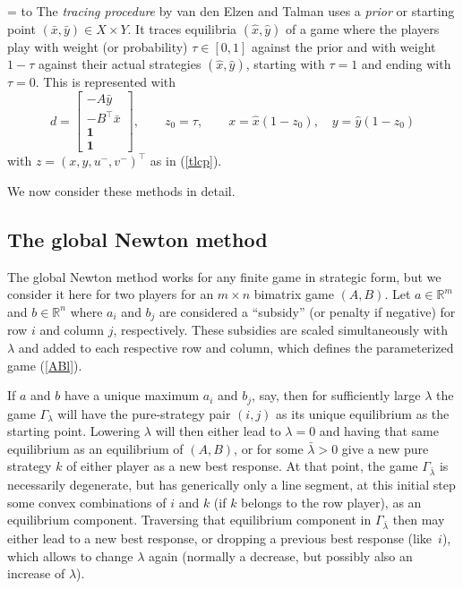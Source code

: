 \documentclass[a4paper,12pt]{article}  %
\def\rmitem#1{\par\hangafter=1\hangindent=\einr
  \noindent\hbox to\einr{\ignorespaces#1\hfill}\ignorespaces}
\newcommand\bullitem{\rmitem{\raise.17ex\hbox{\kern7pt\scriptsize$\bullet$}}}
\theoremstyle{definition}
\def\reals{{\mathbb R}}
\newcommand{\T}{^{\top}}
\newcommand{\0}{{\mathbf0}}
\newcommand{\1}{{\mathbf1}}
\begin{document}
\bullitem
The \textit{tracing procedure} by van den Elzen and Talman
uses a \textit{prior} or starting point $(\bar x,\bar y)\in
X\times Y$.
It traces equilibria $(\hat x,\hat y)$ of a game where the
players play with weight (or probability) $\tau\in[0,1]$
against the prior and with weight $1-\tau$ against their
actual strategies $(\hat x,\hat y)$, starting with $\tau=1$
and ending with $\tau=0$.
This is represented with 
\begin{equation}
\label{ET}
d=\left[\begin{matrix}-A\bar y\\ -B\T\bar x \\ \1\\ \1
\end{matrix}\right],\qquad 
z_0=\tau,
\qquad
x=\hat x(1-z_0),
\quad
y=\hat y(1-z_0)
\end{equation}
with $z=(x,y,u^-,v^-)\T$ as in (\ref{tlcp}).

We now consider these methods in detail.

\subsection{The global Newton method}
\label{s-gnm}

The global Newton method \citep{GW03} works for any finite
game in strategic form, but we consider it here for two
players for an $m\times n$ bimatrix game $(A,B)$.
Let $a\in\reals^m$ and $b\in\reals^n$ where $a_i$ and $b_j$
are considered a ``subsidy'' (or penalty if negative) for
row $i$ and column $j$, respectively.
These subsidies are scaled simultaneously with $\lambda$ and
added to each respective row and column, which defines the
parameterized game (\ref{ABl}).

If $a$ and $b$ have a unique maximum $a_i$ and $b_j$, say,
then for sufficiently large $\lambda$ the game
$\Gamma_\lambda$ will have the pure-strategy pair $(i,j)$ as
its unique equilibrium as the starting point.
Lowering $\lambda$ will then either lead to $\lambda=0$ and
having that same equilibrium as an equilibrium of $(A,B)$,
or for some $\bar\lambda>0$ give a new pure strategy $k$ of
either player as a new best response.
At that point, the game $\Gamma_{\bar\lambda}$ is
necessarily degenerate, but has generically only a line segment,
at this initial step some convex combinations of $i$ and $k$
(if $k$ belongs to the row player), as an equilibrium
component.
Traversing that equilibrium component in
$\Gamma_{\bar\lambda}$ then may either lead to a new best
response, or dropping a previous best response (like~$i$),
which allows to change $\lambda$ again (normally a decrease,
but possibly also an increase of $\lambda$).
\end{document}
